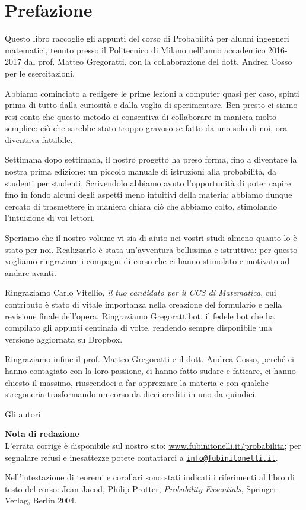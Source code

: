 \section*{Prefazione}
Questo libro raccoglie gli appunti del corso di Probabilità per alunni ingegneri matematici, tenuto presso il Politecnico di Milano nell'anno accademico 2016-2017 dal prof. Matteo Gregoratti, con la collaborazione del dott. Andrea Cosso per le esercitazioni.

Abbiamo cominciato a redigere le prime lezioni a computer quasi per caso, spinti prima di tutto dalla curiosità e dalla voglia di sperimentare. Ben presto ci siamo resi conto che questo metodo ci consentiva di collaborare in maniera molto semplice: ciò che sarebbe stato troppo gravoso se fatto da uno solo di noi, ora diventava fattibile.

Settimana dopo settimana, il nostro progetto ha preso forma, fino a diventare la nostra prima edizione: un piccolo manuale di istruzioni alla probabilità, da studenti per studenti. Scrivendolo abbiamo avuto l’opportunità di poter capire fino in fondo alcuni degli aspetti meno intuitivi della materia; abbiamo dunque cercato di trasmettere in maniera chiara ciò che abbiamo colto, stimolando l'intuizione di voi lettori.

Speriamo che il nostro volume vi sia di aiuto nei vostri studi almeno quanto lo è stato per noi. Realizzarlo è stata un'avventura bellissima e istruttiva: per questo vogliamo ringraziare i compagni di corso che ci hanno stimolato e motivato ad andare avanti.

Ringraziamo Carlo Vitellio, \emph{il tuo candidato per il CCS di Matematica}, cui contributo è stato di vitale importanza nella creazione del formulario e nella revisione finale dell'opera.
Ringraziamo Gregorattibot, il fedele bot che ha compilato gli appunti centinaia di volte, rendendo sempre disponibile una versione aggiornata su Dropbox.

Ringraziamo infine il prof. Matteo Gregoratti e il dott. Andrea Cosso, perché ci hanno contagiato con la loro passione, ci hanno fatto sudare e faticare, ci hanno chiesto il massimo, riuscendoci a far apprezzare la materia e con qualche stregoneria trasformando un corso da dieci crediti in uno da quindici.

\bigskip
\begin{firma}
Gli autori
\end{firma}

\clearpage
{}
{\bf Nota di redazione}\\
L'errata corrige è disponibile sul nostro sito: \url{www.fubinitonelli.it/probabilita}; per segnalare refusi e inesattezze potete contattarci a \href{mailto:info@fubinitonelli.it}{\texttt{info@fubinitonelli.it}}.

Nell'intestazione di teoremi e corollari sono stati indicati i riferimenti al libro di testo del corso: Jean Jacod, Philip Protter, \textit{Probability Essentials}, Springer-Verlag, Berlin 2004.
\clearpage
